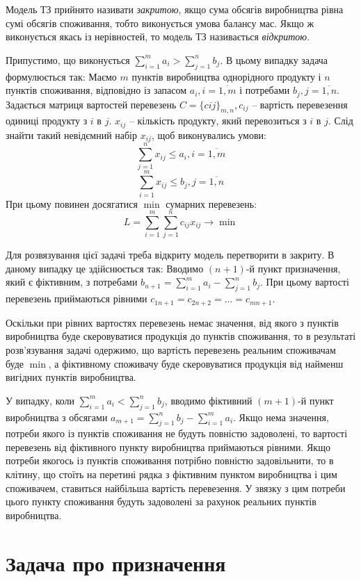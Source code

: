 \documentclass[12pt,a4paper]{book}
\begin{document}
Модель ТЗ прийнято називати \emph{закритою}, якщо сума обсягів виробництва рівна сумі обсягів споживання, тобто виконується умова балансу мас. Якщо ж виконується якась із нерівностей, то модель ТЗ називається \emph{відкритою}.

Припустимо, що виконується $\sum_{i=1}^m a_i > \sum_{j=1}^n b_j$. В цьому випадку задача формулюється так:
Маємо $m$ пунктів виробництва однорідного продукту і $n$ пунктів споживання, відповідно із запасом $a_i, i=\overline{1,m}$ і потребами $b_j, j=\overline{1,n}$. Задається матриця вартостей перевезень $C=\{cij\}_{m,n}, c_{ij}$ – вартість перевезення одиниці продукту з $i$ в $j$. $x_{ij}$ – кількість продукту, який перевозиться з $i$ в $j$.
Слід знайти такий невідємний набір $x_{ij}$, щоб виконувались умови:
\[ \sum_{j=1}^n x_{ij} \le a_i, i=\overline{1,m} \]
\[ \sum_{i=1}^m x_{ij} \le b_j, j=\overline{1,n} \]
При цьому повинен досягатися $\min$ сумарних перевезень:
\[ L = \sum_{i=1}^m \sum_{j=1}^n c_{ij} x_{ij} \to \min \]

Для розвязування цієї задачі треба відкриту модель перетворити в закриту. В даному випадку це здійснюється так:
Вводимо $(n+1)$-й пункт призначення, який є фіктивним, з потребами $b_{n+1} = \sum_{i=1}^m a_i - \sum_{j=1}^n b_j$. При цьому вартості перевезень приймаються рівними $c_{1 n+1} = c_{2 n+2} = \dots = c_{m n+1}$.

Оскільки при рівних вартостях перевезень немає значення, від якого з пунктів виробництва буде скеровуватися продукція до пунктів споживання, то в результаті розв’язування задачі одержимо, що вартість перевезень реальним споживачам буде $\min$, а фіктивному споживачу буде скеровуватися продукція від найменш вигідних пунктів виробництва.

У випадку, коли $\sum_{i=1}^m a_i < \sum_{j=1}^n b_j$, вводимо фіктивний $(m+1)$-й пункт виробництва з обсягами $a_{m+1} = \sum_{j=1}^n b_j - \sum_{i=1}^m a_i$. Якщо нема значення, потреби якого із пунктів споживання не будуть повністю задоволені, то вартості перевезень від фіктивного пункту виробництва приймаються рівними. Якщо потреби якогось із пунктів споживання потрібно повністю задовільнити, то в клітину, що стоїть на перетині рядка з фіктивним пунктом виробництва і цим споживачем, ставиться найбільша вартість перевезення. У звязку з цим потреби цього пункту споживання будуть задоволені за рахунок реальних пунктів виробництва.

\section{Задача про призначення}
\end{document}
